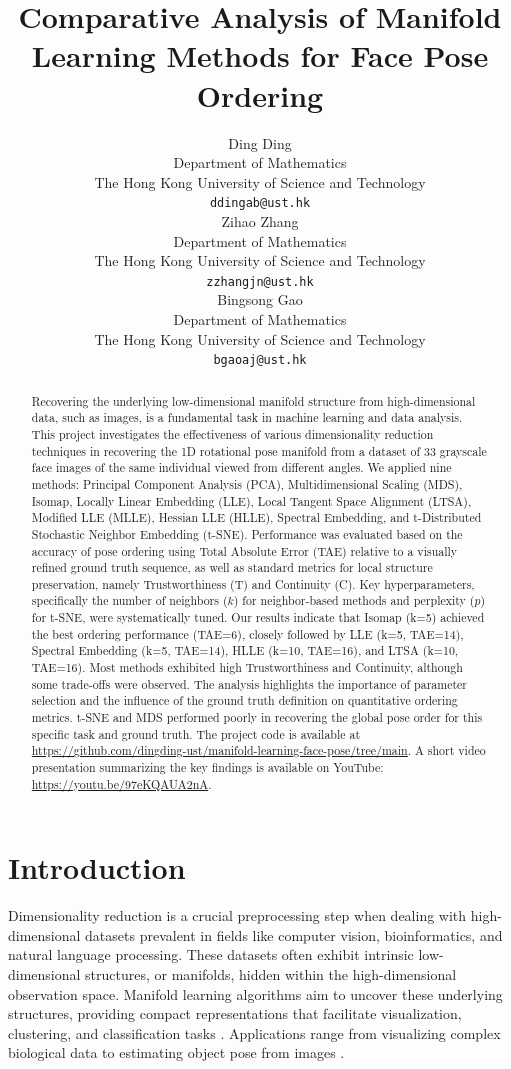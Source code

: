 \documentclass{article}
\title{Comparative Analysis of Manifold Learning Methods for Face Pose Ordering}
\author{%
  Ding Ding \\
  Department of Mathematics\\
  The Hong Kong University of Science and Technology\\
  \texttt{ddingab@ust.hk} \\
  \And
  Zihao Zhang \\
  Department of Mathematics\\
  The Hong Kong University of Science and Technology\\
  \texttt{zzhangjn@ust.hk} \\
  \And
  Bingsong Gao \\
  Department of Mathematics\\
  The Hong Kong University of Science and Technology\\
  \texttt{bgaoaj@ust.hk} \\
}
\begin{document}
\maketitle

\begin{abstract}
  Recovering the underlying low-dimensional manifold structure from high-dimensional data, such as images, is a fundamental task in machine learning and data analysis. This project investigates the effectiveness of various dimensionality reduction techniques in recovering the 1D rotational pose manifold from a dataset of 33 grayscale face images of the same individual viewed from different angles. We applied nine methods: Principal Component Analysis (PCA), Multidimensional Scaling (MDS), Isomap, Locally Linear Embedding (LLE), Local Tangent Space Alignment (LTSA), Modified LLE (MLLE), Hessian LLE (HLLE), Spectral Embedding, and t-Distributed Stochastic Neighbor Embedding (t-SNE). Performance was evaluated based on the accuracy of pose ordering using Total Absolute Error (TAE) relative to a visually refined ground truth sequence, as well as standard metrics for local structure preservation, namely Trustworthiness (T) and Continuity (C). Key hyperparameters, specifically the number of neighbors ($k$) for neighbor-based methods and perplexity ($p$) for t-SNE, were systematically tuned. Our results indicate that Isomap (k=5) achieved the best ordering performance (TAE=6), closely followed by LLE (k=5, TAE=14), Spectral Embedding (k=5, TAE=14), HLLE (k=10, TAE=16), and LTSA (k=10, TAE=16). Most methods exhibited high Trustworthiness and Continuity, although some trade-offs were observed. The analysis highlights the importance of parameter selection and the influence of the ground truth definition on quantitative ordering metrics. t-SNE and MDS performed poorly in recovering the global pose order for this specific task and ground truth. The project code is available at \url{https://github.com/dingding-ust/manifold-learning-face-pose/tree/main}. A short video presentation summarizing the key findings is available on YouTube: \url{https://youtu.be/97eKQAUA2nA}.
\end{abstract}

\section{Introduction}
\label{sec:intro}

Dimensionality reduction is a crucial preprocessing step when dealing with high-dimensional datasets prevalent in fields like computer vision, bioinformatics, and natural language processing. These datasets often exhibit intrinsic low-dimensional structures, or manifolds, hidden within the high-dimensional observation space. Manifold learning algorithms aim to uncover these underlying structures, providing compact representations that facilitate visualization, clustering, and classification tasks \citep{vanDerMaaten2009}. Applications range from visualizing complex biological data to estimating object pose from images \citep{Tenenbaum2000, Roweis2000}.
\end{document}
